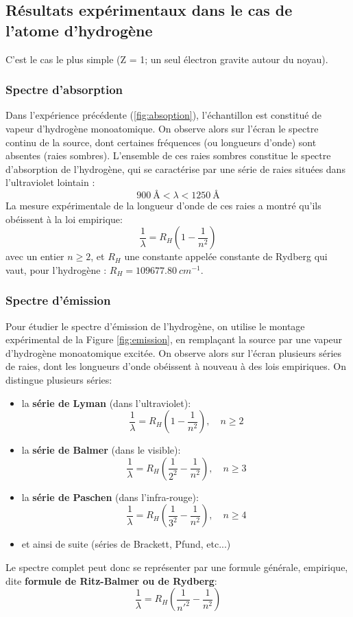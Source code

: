 \documentclass{article}
\begin{document}
\newpage

\subsection{Résultats expérimentaux dans le cas de l'atome d'hydrogène}

C'est le cas le plus simple (Z = 1; un seul électron gravite autour du noyau). 

\subsubsection{Spectre d'absorption} 
Dans l'expérience précédente (\ref{fig:absoption}), l'échantillon est constitué de vapeur d'hydrogène monoatomique. On observe alors sur l'écran le spectre continu de la source, dont certaines fréquences (ou longueurs d'onde) sont absentes (raies sombres). L'ensemble de ces raies sombres constitue le spectre d'absorption de l'hydrogène, qui se caractérise par une série de raies situées dans l'ultraviolet lointain :  
$$\qty{900}{\angstrom} < \lambda < \qty{1250}{\angstrom}$$ 
La mesure expérimentale de la longueur d'onde de ces raies a montré qu'ils obéissent à la loi empirique: 
$$\frac{1}{\lambda} = R_H \left(1-\frac{1}{n^2}\right)$$
avec un entier $n \ge 2$, et $R_H$ une constante appelée constante de Rydberg qui vaut, pour l'hydrogène : $R_H = \qty{109677.80}{cm^{-1}}$. 

\subsubsection{Spectre d'émission}
Pour étudier le spectre d'émission de l'hydrogène, on utilise le montage expérimental de la Figure \ref{fig:emission}, en remplaçant la source par une vapeur d'hydrogène monoatomique excitée. On observe alors sur l'écran plusieurs séries de raies, dont les longueurs d'onde obéissent à nouveau à des lois empiriques. On distingue plusieurs séries: 
\begin{itemize}[label=$\ast$]
    \item la \textbf{série de Lyman} (dans l'ultraviolet): $$\frac{1}{\lambda} = R_H \left(1-\frac{1}{n^2}\right), \quad n \ge 2$$
    \item la \textbf{série de Balmer} (dans le visible): $$\frac{1}{\lambda} = R_H \left(\frac{1}{2^2}-\frac{1}{n^2}\right), \quad n \ge 3$$
    \item la \textbf{série de Paschen} (dans l'infra-rouge): $$\frac{1}{\lambda} = R_H \left(\frac{1}{3^2}-\frac{1}{n^2}\right), \quad n \ge 4$$
    \item et ainsi de suite (séries de Brackett, Pfund, etc...)
\end{itemize} \vspace{5mm}
Le spectre complet peut donc se représenter par une formule générale, empirique, dite \textbf{formule de Ritz-Balmer ou de Rydberg}:
\begin{equation}\label{Ritz-Balmer}
    \boxed{\frac{1}{\lambda} = R_H \left(\frac{1}{n'^2}-\frac{1}{n^2}\right)} 
\end{equation}
\end{document}
